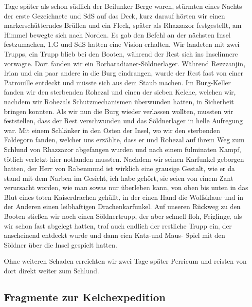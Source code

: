 Tage später als schon südlich der Beilunker Berge waren, stürmten eines Nachts der erste Gezeichnete und SdS auf das Deck, kurz darauf hörten wir einen markerschütterndes Brüllen und ein Fleck, später als Rhazzazor festgestellt, am Himmel bewegte sich nach Norden. Es gab den Befehl an der nächsten Insel festzumachen, 1.G und SdS hatten eine Vision erhalten. Wir landeten mit zwei Trupps, ein Trupp blieb bei den Booten, während der Rest sich ins Inselinnere vorwagte. Dort fanden wir ein Borbaradianer-Söldnerlager. Während Rezzzanjin, Irian und ein paar andere in die Burg eindrangen, wurde der Rest fast von einer Patrouille entdeckt und müsste sich aus dem Staub machen. Im Burg-Keller fanden wir den sterbenden Rohezal und einen der sieben Kelche, welchen wir, nachdem wir Rohezals Schutzmechanismen überwunden hatten, in Sicherheit bringen konnten. Als wir nun die Burg wieder verlassen wollten, mussten wir feststellen, dass der Rest verschwunden und das Söldnerlager in helle Aufregung war. Mit einem Schlänker in den Osten der Insel, wo wir den sterbenden Faldegorn fanden, welcher uns erzählte, dass er und Rohezal auf ihrem Weg zum Schlund von Rhazzazor abgefangen wurden und nach einem fulminaten Kampf, tötlich verletzt hier notlanden mussten. Nachdem wir seinen Karfunkel geborgen hatten, der Herr von Rabenmund ist wirklich eine grausige Gestalt, wie er da stand mit dem Narben im Gesicht, ich habe gehört, sie seien von einem Zant verursacht worden, wie man sowas nur überleben kann, von oben bis unten in das Blut eines toten Kaiserdrachen gehüllt, in der einen Hand die Wolfsklaue und in der Anderen einen leibhaftigen Drachenkarfunkel. Auf unseren Rückweg zu den Booten stießen wir noch einen Söldnertrupp, der aber schnell floh, Feiglinge, als wir schon fast abgelegt hatten, traf auch endlich der restliche Trupp ein, der anscheinend entdeckt wurde und dann eien Katz-und Maus- Spiel mit den Söldner über die Insel gespielt hatten.

Ohne weiteren Schaden erreichten wir zwei Tage später Perricum und reisten von dort direkt weiter zum Schlund.

\subsection{Fragmente zur Kelchexpedition}

